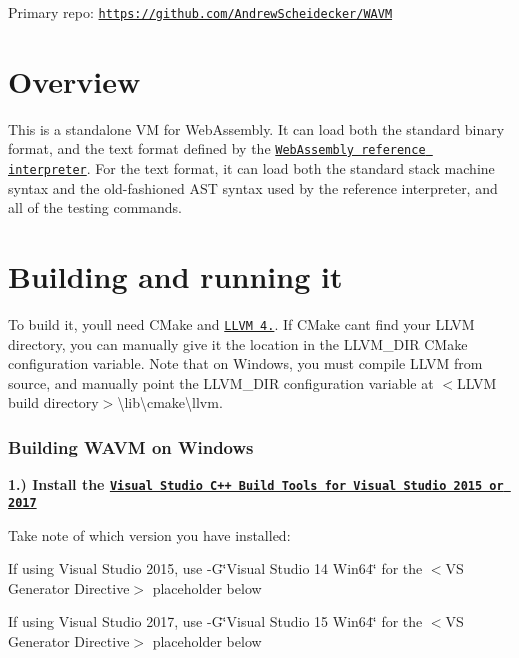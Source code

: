 \href{https://travis-ci.org/AndrewScheidecker/WAVM}{\tt }

Primary repo\+: \href{https://github.com/AndrewScheidecker/WAVM}{\tt https\+://github.\+com/\+Andrew\+Scheidecker/\+W\+A\+VM}

\section*{Overview}

This is a standalone VM for Web\+Assembly. It can load both the standard binary format, and the text format defined by the \href{https://github.com/WebAssembly/spec/tree/master/ml-proto}{\tt Web\+Assembly reference interpreter}. For the text format, it can load both the standard stack machine syntax and the old-\/fashioned A\+ST syntax used by the reference interpreter, and all of the testing commands.

\section*{Building and running it}

To build it, you\textquotesingle{}ll need C\+Make and \href{http://llvm.org/releases/download.html#4.0.0}{\tt L\+L\+VM 4.}. If C\+Make can\textquotesingle{}t find your L\+L\+VM directory, you can manually give it the location in the L\+L\+V\+M\+\_\+\+D\+IR C\+Make configuration variable. Note that on Windows, you must compile L\+L\+VM from source, and manually point the L\+L\+V\+M\+\_\+\+D\+IR configuration variable at {\ttfamily $<$L\+L\+VM build directory$>$\textbackslash{}lib\textbackslash{}cmake\textbackslash{}llvm}.

\subsubsection*{Building W\+A\+VM on Windows}

{\bfseries 1.) Install the \href{http://landinghub.visualstudio.com/visual-cpp-build-tools}{\tt Visual Studio C++ Build Tools for Visual Studio 2015 or 2017}}

Take note of which version you have installed\+:


\begin{DoxyItemize}
\item If using Visual Studio 2015, use {\ttfamily -\/G\char`\"{}\+Visual Studio 14 Win64\char`\"{}} for the {\ttfamily $<$VS Generator Directive$>$} placeholder below
\item If using Visual Studio 2017, use {\ttfamily -\/G\char`\"{}\+Visual Studio 15 Win64\char`\"{}} for the {\ttfamily $<$VS Generator Directive$>$} placeholder below
\end{DoxyItemize}

